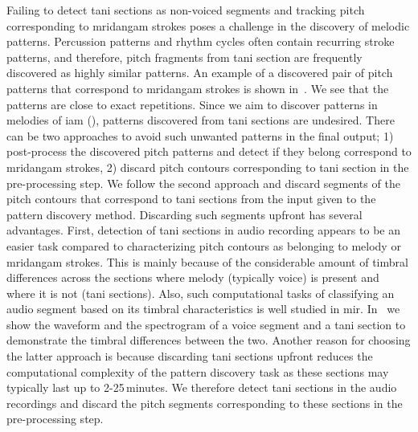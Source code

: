 {Failing to detect \gls{tani} sections as non-voiced segments and tracking pitch corresponding to \gls{mridangam} strokes poses a challenge in the discovery of melodic patterns. Percussion patterns and rhythm cycles often contain recurring stroke patterns, and therefore, pitch fragments from \gls{tani} section are frequently discovered as highly similar patterns. An example of a discovered pair of pitch patterns that correspond to \gls{mridangam} strokes is shown in~. We see that the patterns are close to exact repetitions. Since we aim to discover patterns in melodies of \gls{iam} (), patterns discovered from \gls{tani} sections are undesired. There can be two approaches to avoid such unwanted patterns in the final output; 1) post-process the discovered pitch patterns and detect if they belong correspond to \gls{mridangam} strokes, 2) discard pitch contours corresponding to \gls{tani} section in the pre-processing step. We follow the second approach and discard segments of the pitch contours that correspond to \gls{tani} sections from the input given to the pattern discovery method. Discarding such segments upfront has several advantages. First, detection of \gls{tani} sections in audio recording appears to be an easier task compared to characterizing pitch contours as belonging to melody or \gls{mridangam} strokes. This is mainly because of the considerable amount of timbral differences across the sections where melody (typically voice) is present and where it is not (\gls{tani} sections). Also, such computational tasks of classifying an audio segment based on its timbral characteristics is well studied in \gls{mir}. In~ we show the waveform and the spectrogram of a voice segment and a \gls{tani} section to demonstrate the timbral differences between the two. Another reason for choosing the latter approach is because discarding \gls{tani} sections upfront reduces the computational complexity of the pattern discovery task as these sections may typically last up to 2-25\,minutes. We therefore detect \gls{tani} sections in the audio recordings and discard the pitch segments corresponding to these sections in the pre-processing step.

}

